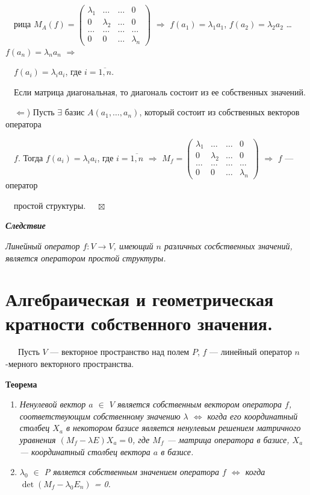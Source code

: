 \documentclass[a4paper, 12pt]{report}
\begin{document}
	$\quad$рица $M_A(f) = \begin{pmatrix} \lambda_1 & \dots & \dots & 0 \\ 0 & \lambda_2 & \dots & 0 \\ \dots & \dots & \dots & \dots \\ 0 & 0 & \dots & \lambda_n \end{pmatrix}$ $\Rightarrow$ $f(a_1) = \lambda_1 a_1$, $f(a_2) = \lambda_2 a_2$ \dots $f(a_n) = \lambda_n a_n$ $\Rightarrow$ 
	\par\bigskip
	$\quad f(a_i) = \lambda_i a_i$, где $i = \overline{1, n}$.
	\par\bigskip
	$\quad$Если матрица диагональная, то диагональ состоит из ее собственных значений. 
	\par\bigskip
	$\quad$$\Leftarrow$) Пусть $\exists$ базис $A(a_1, \dots, a_n)$, который состоит из собственных векторов оператора
	
	$\quad f$. Тогда $f(a_i) = \lambda_i a_i$, где $i = \overline{1, n}$ $\Rightarrow$ $M_f = \begin{pmatrix} \lambda_1 & \dots & \dots & 0 \\ 0 & \lambda_2 & \dots & 0 \\ \dots & \dots & \dots & \dots \\ 0 & 0 & \dots & \lambda_n \end{pmatrix}$ $\Rightarrow$ $f$ --- оператор 
	
	$\quad$простой структуры. $\quad \boxtimes$
	
	\par\bigskip
	\textit{\textbf{Следствие}}
	
	\textit{Линейный оператор $f: V \rightarrow V$, имеющий $n$ различных сосбственных значений, является оператором простой структуры.} 
	
	
	
	
	
	
	
	
	
	
	
	
	\section{Алгебраическая и геометрическая кратности собственного значения.}
	
	$\quad \; \ $Пусть $V$ --- векторное пространство над полем $P$, $f$ --- линейный оператор $n$-мерного векторного пространства.
	\par\bigskip
	\textbf{Теорема}
	\begin{enumerate}
		\item \textit{Ненулевой вектор $a$ $\in$ $V$ является собственным вектором оператора $f$, соответствующим собственному значению $\lambda$ $\Longleftrightarrow$ когда его координатный столбец $X_a$ в некотором базисе является ненулевым решением матричного уравнения $(M_f - \lambda E)X_a = 0$, где $M_f$ --- матрица оператора в базисе, $X_a$ --- координатный столбец вектора $a$ в базисе. }
		\item \textit{$\lambda_0$ $\in$ P является собственным значением оператора $f$ $\Leftrightarrow$ когда
			$\det(M_f - \lambda_0 E_n)$ = 0.}
	\end{enumerate}
	
\end{document}
